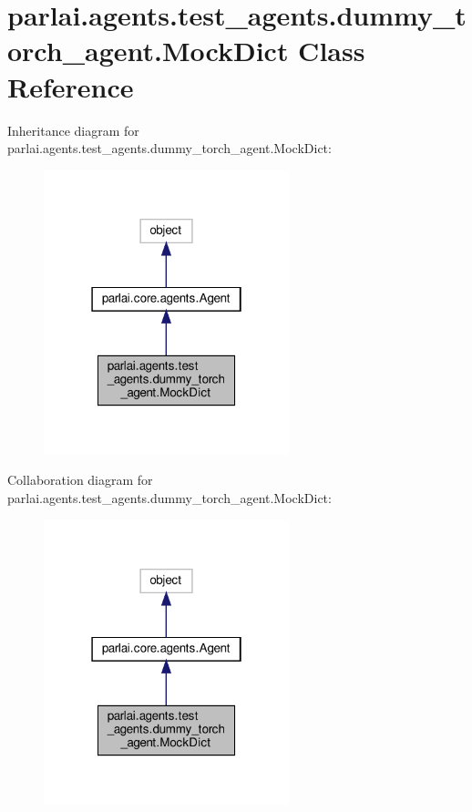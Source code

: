 \hypertarget{classparlai_1_1agents_1_1test__agents_1_1dummy__torch__agent_1_1MockDict}{}\section{parlai.\+agents.\+test\+\_\+agents.\+dummy\+\_\+torch\+\_\+agent.\+Mock\+Dict Class Reference}
\label{classparlai_1_1agents_1_1test__agents_1_1dummy__torch__agent_1_1MockDict}


Inheritance diagram for parlai.\+agents.\+test\+\_\+agents.\+dummy\+\_\+torch\+\_\+agent.\+Mock\+Dict\+:\nopagebreak
\begin{figure}[H]
\begin{center}
\leavevmode
\includegraphics[width=202pt]{de/db6/classparlai_1_1agents_1_1test__agents_1_1dummy__torch__agent_1_1MockDict__inherit__graph}
\end{center}
\end{figure}


Collaboration diagram for parlai.\+agents.\+test\+\_\+agents.\+dummy\+\_\+torch\+\_\+agent.\+Mock\+Dict\+:
\nopagebreak
\begin{figure}[H]
\begin{center}
\leavevmode
\includegraphics[width=202pt]{d1/d32/classparlai_1_1agents_1_1test__agents_1_1dummy__torch__agent_1_1MockDict__coll__graph}
\end{center}
\end{figure}
